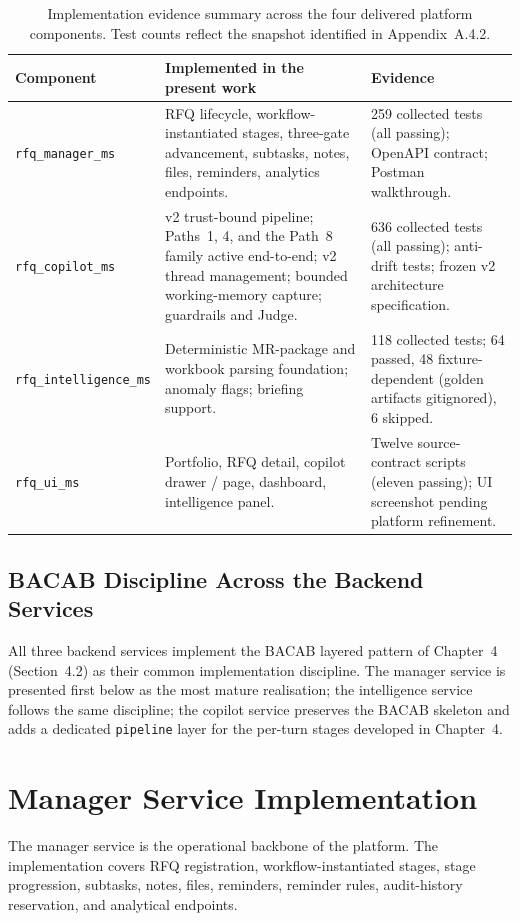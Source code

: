\begin{table}[H]
\centering
\renewcommand{\arraystretch}{1.3}
\begin{tabularx}{\linewidth}{|p{3.2cm}|X|p{4.2cm}|}
\hline
\rowcolor{lightgray}
\textbf{Component} & \textbf{Implemented in the present work} & \textbf{Evidence} \\ \hline
\texttt{rfq\_manager\_ms} & RFQ lifecycle, workflow-instantiated stages, three-gate advancement, subtasks, notes, files, reminders, analytics endpoints. & 259 collected tests (all passing); OpenAPI contract; Postman walkthrough. \\ \hline
\texttt{rfq\_copilot\_ms} & v2 trust-bound pipeline; Paths~1, 4, and the Path~8 family active end-to-end; v2 thread management; bounded working-memory capture; guardrails and Judge. & 636 collected tests (all passing); anti-drift tests; frozen v2 architecture specification. \\ \hline
\texttt{rfq\_intelligence\_ms} & Deterministic MR-package and workbook parsing foundation; anomaly flags; briefing support. & 118 collected tests; 64 passed, 48 fixture-dependent (golden artifacts gitignored), 6 skipped. \\ \hline
\texttt{rfq\_ui\_ms} & Portfolio, RFQ detail, copilot drawer / page, dashboard, intelligence panel. & Twelve source-contract scripts (eleven passing); UI screenshot pending platform refinement. \\ \hline
\end{tabularx}
\caption{Implementation evidence summary across the four delivered platform components. Test counts reflect the snapshot identified in Appendix~A.4.2.}
\label{tab:impl_evidence}
\end{table}

\subsection{BACAB Discipline Across the Backend Services}
All three backend services implement the BACAB layered pattern of Chapter~4 (Section~4.2) as their common implementation discipline. The manager service is presented first below as the most mature realisation; the intelligence service follows the same discipline; the copilot service preserves the BACAB skeleton and adds a dedicated \texttt{pipeline} layer for the per-turn stages developed in Chapter~4.

\section{Manager Service Implementation}
The manager service is the operational backbone of the platform. The implementation covers RFQ registration, workflow-instantiated stages, stage progression, subtasks, notes, files, reminders, reminder rules, audit-history reservation, and analytical endpoints.

